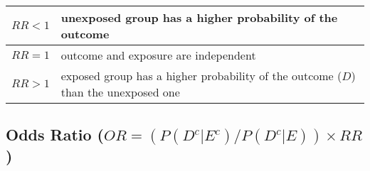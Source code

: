 \begin{customArrayStretch}{1.2}
    \begin{table}[H]
        \centering
        \begin{tabular}{|c|p{14cm}|}
            \hline

            $RR < 1$ & unexposed group has a higher probability of the outcome
            \cite{statistics/book/Statistics-for-Data-Scientists/Maurits-Kaptein} \\
            \hline

            $RR = 1$ & outcome and exposure are independent
            \cite{statistics/book/Statistics-for-Data-Scientists/Maurits-Kaptein} \\
            \hline

            $RR > 1$ & exposed group has a higher probability of the outcome ($D$) than the unexposed one
            \cite{statistics/book/Statistics-for-Data-Scientists/Maurits-Kaptein} \\
            \hline
        \end{tabular}
    \end{table}
\end{customArrayStretch}



\subsection{Odds Ratio ($OR = ({P (D^c|E^c)}/{P (D^c|E)}) \times RR$)}

